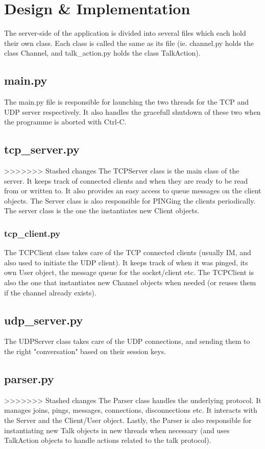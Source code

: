 \documentclass[12pt]{rapport}
\begin{document}
\section*{Design \& Implementation}
The server-side of the application is divided into several files which
each hold their own class. Each class is called the same as its file
(ie. channel.py holds the class Channel, and talk\_action.py holds the
class TalkAction).

\subsection*{main.py}
The main.py file is responsible for launching the two threads for the 
TCP and UDP server respectively. It also handles the gracefull shutdown 
of these two when the programme is aborted with Ctrl-C.

\subsection*{tcp\_server.py}
>>>>>>> Stashed changes
The TCPServer class is the main class of the server. It keeps track of
connected clients and when they are ready to be read from or written
to. It also provides an easy access to queue messages on the client
objects. The Server class is also responsible for PINGing the clients
periodically. The server class is the one the instantiates new Client
objects.

\subsubsection*{tcp\_client.py}
The TCPClient class takes care of the TCP connected clients (usually
IM, and also used to initiate the UDP client). It keeps track of when
it was pinged, its own User object, the message queue for the
socket/client etc. The TCPClient is also the one that instantiates new
Channel objects when needed (or reuses them if the channel already
exists).

\subsection*{udp\_server.py}
The UDPServer class takes care of the UDP connections, and sending them 
to the right "conversation" based on their session keys.

\subsection*{parser.py}
>>>>>>> Stashed changes
The Parser class handles the underlying protocol. It manages joins,
pings, messages, connections, disconnections etc. It interacts with
the Server and the Client/User object. Lastly, the Parser is also
responsible for instantiating new Talk objects in new threads when
necessary (and uses TalkAction objects to handle actions related to
the talk protocol).
\end{document}
